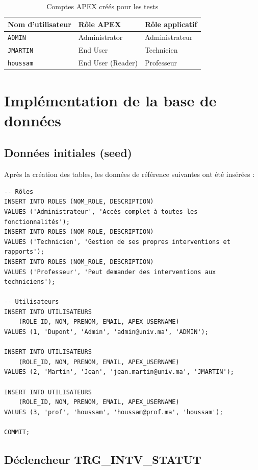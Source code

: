 \documentclass[12pt,a4paper,oneside]{report}
\begin{document}
\begin{table}[H]
  \centering
  \caption{Comptes APEX créés pour les tests}
  \begin{tabular}{@{}lll@{}}
    \toprule
    \textbf{Nom d'utilisateur} & \textbf{Rôle APEX} & \textbf{Rôle applicatif} \\
    \midrule
    \texttt{ADMIN}   & Administrator & Administrateur \\
    \texttt{JMARTIN} & End User      & Technicien \\
    \texttt{houssam} & End User (Reader) & Professeur \\
    \bottomrule
  \end{tabular}
  \label{tab:comptes}
\end{table}

\section{Implémentation de la base de données}

\subsection{Données initiales (seed)}

Après la création des tables, les données de référence suivantes ont été insérées :

\begin{lstlisting}[language=PLSQL, caption=Insertion des données de référence]
-- Rôles
INSERT INTO ROLES (NOM_ROLE, DESCRIPTION)
VALUES ('Administrateur', 'Accès complet à toutes les fonctionnalités');
INSERT INTO ROLES (NOM_ROLE, DESCRIPTION)
VALUES ('Technicien', 'Gestion de ses propres interventions et rapports');
INSERT INTO ROLES (NOM_ROLE, DESCRIPTION)
VALUES ('Professeur', 'Peut demander des interventions aux techniciens');

-- Utilisateurs
INSERT INTO UTILISATEURS
    (ROLE_ID, NOM, PRENOM, EMAIL, APEX_USERNAME)
VALUES (1, 'Dupont', 'Admin', 'admin@univ.ma', 'ADMIN');

INSERT INTO UTILISATEURS
    (ROLE_ID, NOM, PRENOM, EMAIL, APEX_USERNAME)
VALUES (2, 'Martin', 'Jean', 'jean.martin@univ.ma', 'JMARTIN');

INSERT INTO UTILISATEURS
    (ROLE_ID, NOM, PRENOM, EMAIL, APEX_USERNAME)
VALUES (3, 'prof', 'houssam', 'houssam@prof.ma', 'houssam');

COMMIT;
\end{lstlisting}

\subsection{Déclencheur TRG\_INTV\_STATUT}
\end{document}
